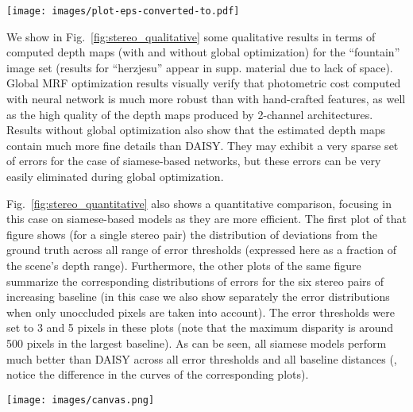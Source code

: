 \documentclass[10pt,twocolumn,letterpaper]{article}
\newcommand*{\USEIMAGES}{}
\begin{document}
\ifdefined\USEIMAGES
\begin{figure*}
%
%
%
\texttt{[image: images/plot-eps-converted-to.pdf]}
%
%
\caption{Quantitative comparison for wide-baseline stereo on ``fountain'' dataset. (Leftmost plot) Distribution of deviations from ground truth, %
expressed as a fraction of scene's depth range. (Other plots) Distribution of errors for stereo pairs of increasing baseline (horizontal axis) both with and without taking into account  occluded pixels (error thresholds were set equal to 1 and 3 pixels in these plots -  maximum disparity is around 500 pixels). 
}
\label{fig:stereo_quantitative}
\end{figure*}
\fi
We  show in Fig.~\ref{fig:stereo_qualitative} some qualitative results in terms of computed depth maps  (with and without global optimization) for the ``fountain'' image set (results for ``herzjesu'' appear in  supp. material due to lack of space). Global
MRF optimization results   visually verify that photometric cost computed with neural network
is much more robust than with hand-crafted features, as well as the high quality of the depth maps produced by 2-channel architectures. Results without global optimization also show that the estimated  depth maps  contain much more fine details than DAISY. They may exhibit a very sparse set of errors  for the case of siamese-based networks,  but these errors can be very easily eliminated during global optimization.

Fig.~\ref{fig:stereo_quantitative} also shows a quantitative comparison, focusing in this case on siamese-based models as they are more efficient. The first plot of that figure shows (for a single stereo pair) the distribution of deviations from the ground truth across all range of error thresholds (expressed here as a fraction of the scene's depth range).
Furthermore, the other plots of the same figure summarize the corresponding distributions of errors for the six stereo pairs of increasing baseline (in this case we  also  show separately the error distributions when  only unoccluded pixels are taken into account). The error thresholds  were set to 3 and 5 pixels  in these plots (note that the maximum disparity is around 500 pixels in the largest baseline). 
As can be seen, all siamese models 
perform much better than DAISY across all error thresholds and all baseline distances 
(\eg, notice the difference in the curves of the corresponding plots).

\ifdefined\USEIMAGES
\begin{figure*}
  \vspace{-5pt}
\begin{center}
  \texttt{[image: images/canvas.png]}
\end{center}
\vspace{-5pt}
\caption{Wide baseline stereo evaluation. From left to right:
  DAISY, \texttt{siam-2stream-}$l_2$, , \texttt{2ch}. First row - ``winner takes all'' depthmaps,
  second row - depthmaps after MRF optimization.}
  \label{fig:stereo_qualitative}
\end{figure*}
\fi
\end{document}
